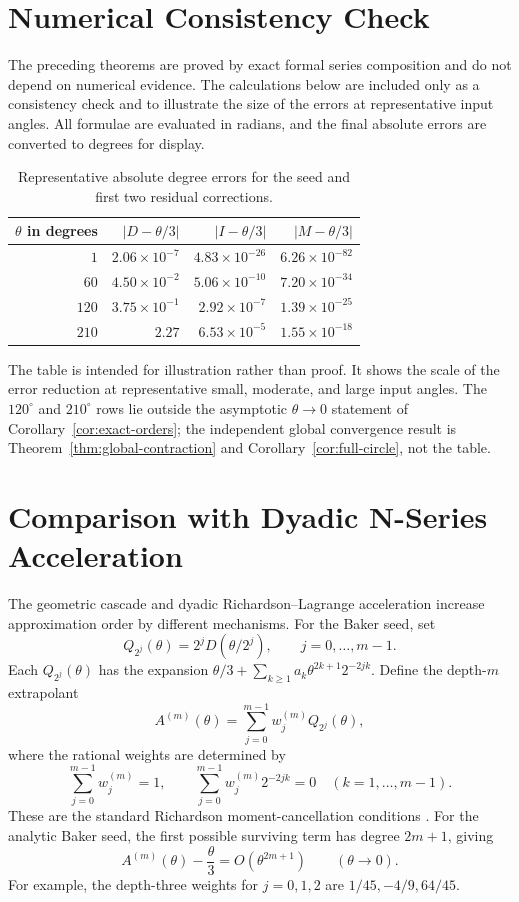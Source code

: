 \documentclass[11pt]{article}
\theoremstyle{remark}
\begin{document}
\section{Numerical Consistency Check}
\label{sec:numerical-check}

The preceding theorems are proved by exact formal series composition and do not depend on numerical evidence. The calculations below are included only as a consistency check and to illustrate the size of the errors at representative input angles. All formulae are evaluated in radians, and the final absolute errors are converted to degrees for display.

\begin{table}[h]
\centering
\begin{tabular}{rrrr}
\toprule
$\theta$ in degrees & $|D-\theta/3|$ & $|I-\theta/3|$ & $|M-\theta/3|$ \\
\midrule
$1$   & $2.06\times 10^{-7}$  & $4.83\times 10^{-26}$ & $6.26\times 10^{-82}$ \\
$60$  & $4.50\times 10^{-2}$  & $5.06\times 10^{-10}$ & $7.20\times 10^{-34}$ \\
$120$ & $3.75\times 10^{-1}$  & $2.92\times 10^{-7}$  & $1.39\times 10^{-25}$ \\
$210$ & $2.27$                & $6.53\times 10^{-5}$  & $1.55\times 10^{-18}$ \\
\bottomrule
\end{tabular}
\caption{Representative absolute degree errors for the seed and first two residual corrections.}
\label{tab:numerical}
\end{table}

The table is intended for illustration rather than proof. It shows the scale of the error reduction at representative small, moderate, and large input angles. The $120^\circ$ and $210^\circ$ rows lie outside the asymptotic $\theta\to0$ statement of Corollary~\ref{cor:exact-orders}; the independent global convergence result is Theorem~\ref{thm:global-contraction} and Corollary~\ref{cor:full-circle}, not the table.


\section{Comparison with Dyadic N-Series Acceleration}
\label{sec:nseries-comparison}

The geometric cascade and dyadic Richardson--Lagrange acceleration
increase approximation order by different mechanisms. For the Baker
seed, set
\[
Q_{2^j}(\theta)=2^jD(\theta/2^j),\qquad j=0,\ldots,m-1.
\]
Each $Q_{2^j}(\theta)$ has the expansion
$\theta/3+\sum_{k\ge1}a_k\theta^{2k+1}2^{-2jk}$.
Define the depth-$m$ extrapolant
\[
A^{(m)}(\theta)=\sum_{j=0}^{m-1}w_j^{(m)}Q_{2^j}(\theta),
\]
where the rational weights are determined by
\[
\sum_{j=0}^{m-1}w_j^{(m)}=1,
\qquad
\sum_{j=0}^{m-1}w_j^{(m)}2^{-2jk}=0
\quad (k=1,\ldots,m-1).
\]
These are the standard Richardson moment-cancellation conditions
\cite{Richardson1911,StoerBulirsch2002}.
For the analytic Baker seed, the first possible surviving term has degree
$2m+1$, giving
\[
A^{(m)}(\theta)-\frac\theta3=O(\theta^{2m+1})
\qquad(\theta\to0).
\]
For example, the depth-three weights for $j=0,1,2$ are
$1/45,-4/9,64/45$.
\end{document}
